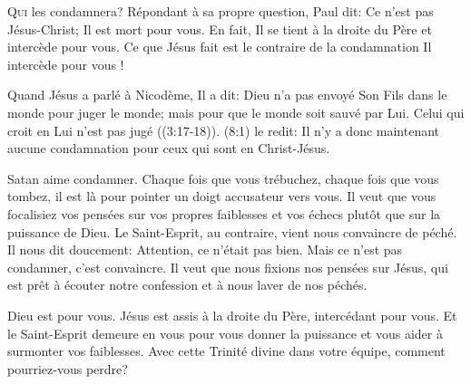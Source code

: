 


\lettrine[ante=\Og]{Q}{ui} les condamnera? \Fg{}
 Répondant à sa propre question, Paul dit: 
 \Og Ce n'est pas Jésus-Christ; Il est mort pour vous.
 En fait, Il se tient à la droite du Père et intercède pour vous. \Fg{}
 Ce que Jésus fait est le contraire de la condamnation
 \ocadr Il intercède pour vous !

Quand Jésus a parlé à Nicodème, Il a dit: 
 \Og Dieu n'a pas envoyé Son Fils dans le monde pour juger le monde;
 mais pour que le monde soit sauvé par Lui. Celui qui croit en Lui
 n'est pas jugé \Fg{} ((3:17-18)).
 (8:1) le redit: 
 \Og Il n'y a donc maintenant aucune condamnation
 pour ceux qui sont en Christ-Jésus. \Fg{}


Satan aime condamner. Chaque fois que vous trébuchez,
 chaque fois que vous tombez, il est là pour pointer un doigt accusateur
 vers vous. Il veut que vous focalisiez vos pensées sur vos propres faiblesses
 et vos échecs plutôt que sur la puissance de Dieu.
 Le Saint-Esprit, au contraire, vient nous convaincre de péché.
 Il nous dit doucement: 
 \Og Attention, ce n'était pas bien. \Fg{}
 Mais ce n'est pas condamner, c'est convaincre.
 Il veut que nous fixions nos pensées sur Jésus,
 qui est prêt à écouter notre confession et à nous laver de nos péchés.

Dieu est pour vous. Jésus est assis à la droite du Père,
 intercédant pour vous. Et le Saint-Esprit demeure en vous
 pour vous donner la puissance et vous aider à surmonter vos faiblesses.
 Avec cette Trinité divine dans 
 votre équipe, comment pourriez-vous perdre?

\dvrule



